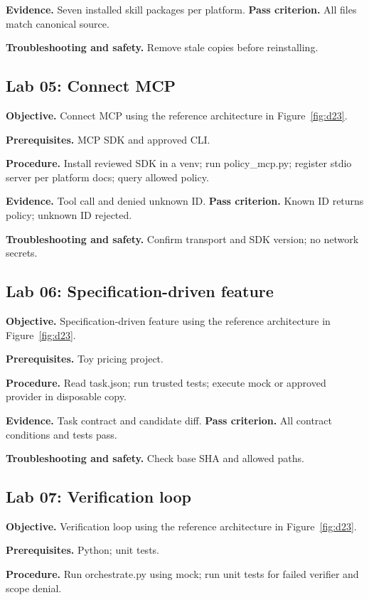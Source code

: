 \textbf{Evidence.} Seven installed skill packages per platform. \textbf{Pass criterion.} All files match canonical source.

\textbf{Troubleshooting and safety.} Remove stale copies before reinstalling.

\subsection{Lab 05: Connect MCP}

\textbf{Objective.} Connect MCP using the reference architecture in Figure~\ref{fig:d23}.

\textbf{Prerequisites.} MCP SDK and approved CLI.

\textbf{Procedure.} Install reviewed SDK in a venv; run policy\_mcp.py; register stdio server per platform docs; query allowed policy.

\textbf{Evidence.} Tool call and denied unknown ID. \textbf{Pass criterion.} Known ID returns policy; unknown ID rejected.

\textbf{Troubleshooting and safety.} Confirm transport and SDK version; no network secrets.

\subsection{Lab 06: Specification-driven feature}

\textbf{Objective.} Specification-driven feature using the reference architecture in Figure~\ref{fig:d23}.

\textbf{Prerequisites.} Toy pricing project.

\textbf{Procedure.} Read task.json; run trusted tests; execute mock or approved provider in disposable copy.

\textbf{Evidence.} Task contract and candidate diff. \textbf{Pass criterion.} All contract conditions and tests pass.

\textbf{Troubleshooting and safety.} Check base SHA and allowed paths.

\subsection{Lab 07: Verification loop}

\textbf{Objective.} Verification loop using the reference architecture in Figure~\ref{fig:d23}.

\textbf{Prerequisites.} Python; unit tests.

\textbf{Procedure.} Run orchestrate.py using mock; run unit tests for failed verifier and scope denial.


